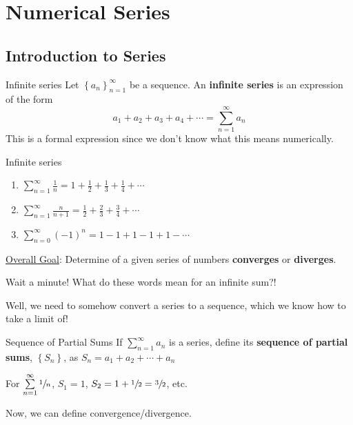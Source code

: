 \chapter{Numerical Series}
\section{Introduction to Series}
\begin{Definition}{Infinite series}{}
    Let $ \left\{ a_n\right\}_{n=1}^\infty $ be a sequence. An
    \textbf{infinite series} is an expression of the form
    \[ a_1+a_2+a_3+a_4+\cdots=\sum\limits_{n=1}^{\infty}a_n \]
    This is a formal expression since we don't know what this means numerically.
\end{Definition}

\begin{Example}{Infinite series}{}
    \begin{enumerate}[label=(\roman*)]
        \item $ \displaystyle\sum\limits_{n=1}^{\infty} \frac{1}{n} =1+\frac{1}{2} +\frac{1}{3} +\frac{1}{4}+\cdots $
        \item $ \displaystyle\sum\limits_{n=1}^{\infty} \frac{n}{n+1} =\frac{1}{2} +\frac{2}{3} +\frac{3}{4} +\cdots $
        \item $ \displaystyle\sum\limits_{n=0}^{\infty} (-1)^n=1-1+1-1+1-\cdots $
    \end{enumerate}
\end{Example}
\underline{Overall Goal}: Determine of a given series of numbers \textbf{converges}
or \textbf{diverges}.

Wait a minute! What do these words mean for an infinite sum?!

Well, we need to somehow convert a series to a sequence, which we know how to take a limit of!

\begin{Definition}{Sequence of Partial Sums}{}
    If $ \sum\limits_{n=1}^{\infty} a_n $ is a series, define its
    \textbf{sequence of partial sums}, $ \left\{ S_n\right\} $, as $ S_n=a_1+a_2+\cdots+a_n $
\end{Definition}

\begin{Example}{}{}
    For $ \sum\limits_{n=1}^{\infty} \sfrac{1}{n} $, $ S_1=1 $, $ S_2=1+\sfrac{1}{2}=\sfrac{3}{2} $,
    etc.
\end{Example}

Now, we can define convergence/divergence.

